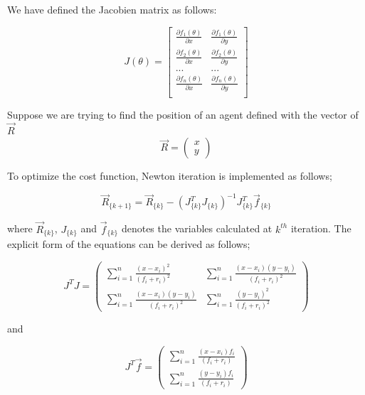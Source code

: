 We have defined the Jacobien matrix as follows:

\begin{equation}
J(\theta) = \begin{bmatrix}
\frac{\partial{f_1(\theta)}}{\partial{x}} & \frac{\partial{f_1(\theta)}}{\partial{y}} \\
\frac{\partial{f_2(\theta)}}{\partial{x}} & \frac{\partial{f_2(\theta)}}{\partial{y}} \\
... & ... \\
\frac{\partial{f_n(\theta)}}{\partial{x}} & \frac{\partial{f_n(\theta)}}{\partial{y}} \\
\end{bmatrix}
\end{equation}

	
Suppose we are trying to find the position of an agent defined with the vector of $\vec{R}$	
\begin{equation}
 \vec{R} = \left(\begin{matrix}
  x \\ y 
 \end{matrix}\right)
\end{equation}

To optimize the cost function, Newton iteration is implemented as follows;

\begin{equation}
 \vec{R}_{\{k+1\}} =  \vec{R}_{\{k\}} - (J^T_{\{k\}}J_{\{k\}})^{-1}J^T_{\{k\}}\vec{f}_{\{k\}}
\end{equation}	

where $\vec{R}_{\{k\}}$, $J_{\{k\}}$ and $\vec{f}_{\{k\}}$ denotes the variables calculated at $k^{th}$ iteration. The explicit form of the equations can be derived as follows;
	
\begin{equation}
J^TJ = \left(\begin{matrix}
\sum_{i=1}^{n} \frac{(x-x_i)^2}{(f_i+r_i)^2} &  \sum_{i=1}^{n} \frac{(x-x_i)(y-y_i)}{(f_i+r_i)^2} \\
\sum_{i=1}^{n} \frac{(x-x_i)(y-y_i)}{(f_i+r_i)^2} &  \sum_{i=1}^{n} \frac{(y-y_i)^2}{(f_i+r_i)^2}
\end{matrix}\right)
\end{equation}	

and 

\begin{equation}
J^T\vec{f} = \left(\begin{matrix}
\sum_{i=1}^{n}\frac{(x-x_i)f_i}{(f_i+r_i)} \\
\sum_{i=1}^{n}\frac{(y-y_i)f_i}{(f_i+r_i)}
\end{matrix}\right)
\end{equation}
	
